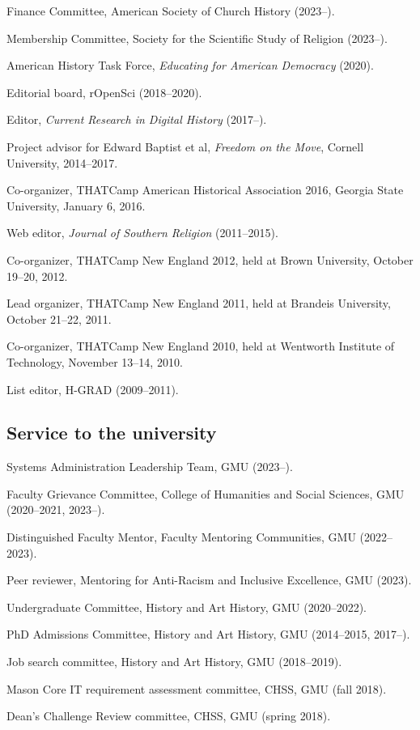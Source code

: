 \documentclass[11pt]{article}
\begin{document}
Finance Committee, American Society of Church History (2023--).

Membership Committee, Society for the Scientific Study of Religion (2023--).

American History Task Force, \emph{Educating for American Democracy} (2020).

Editorial board, rOpenSci (2018--2020).

Editor, \emph{Current Research in Digital History} (2017--).

Project advisor for Edward Baptist et al, \emph{Freedom on the Move}, Cornell University, 2014--2017.

Co-organizer, THATCamp American Historical Association 2016, Georgia State University, January 6, 2016.

Web editor, \emph{Journal of Southern Religion} (2011--2015).

Co-organizer, THATCamp New England 2012, held at Brown University, October 19--20, 2012.

Lead organizer, THATCamp New England 2011, held at Brandeis University, October 21--22, 2011.

Co-organizer, THATCamp New England 2010, held at Wentworth Institute of Technology, November 13--14, 2010.

List editor, H-GRAD (2009--2011).

\subsection{Service to the university}\label{Service to the university}

Systems Administration Leadership Team, GMU (2023--).

Faculty Grievance Committee, College of Humanities and Social Sciences, GMU 
(2020--2021, 2023--).

Distinguished Faculty Mentor, Faculty Mentoring Communities, GMU (2022--2023).

Peer reviewer, Mentoring for Anti-Racism and Inclusive Excellence, GMU (2023).

Undergraduate Committee, History and Art History, GMU (2020--2022).

PhD Admissions Committee, History and Art History, GMU (2014--2015, 2017--).

Job search committee, History and Art History, GMU (2018--2019).

Mason Core IT requirement assessment committee, CHSS, GMU (fall 2018).

Dean's Challenge Review committee, CHSS, GMU (spring 2018).
\end{document}
